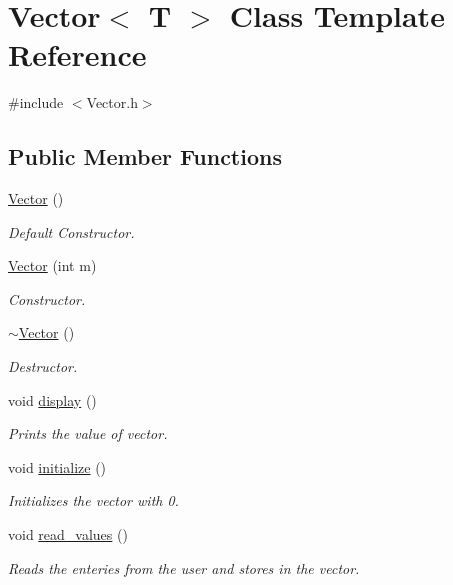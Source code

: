 \hypertarget{class_vector}{}\section{Vector$<$ T $>$ Class Template Reference}
\label{class_vector}


{\ttfamily \#include $<$Vector.\+h$>$}

\subsection*{Public Member Functions}
\begin{DoxyCompactItemize}
\item 
\hyperlink{class_vector_a39d6069675db4ecfc1ab81d440da759a}{Vector} ()
\begin{DoxyCompactList}\small\item\em Default Constructor. \end{DoxyCompactList}\item 
\hyperlink{class_vector_a7233eaf600bca59dbd1a195ccb465cf5}{Vector} (int m)
\begin{DoxyCompactList}\small\item\em Constructor. \end{DoxyCompactList}\item 
\hyperlink{class_vector_aadd88501ee4d48b6da9fa12530373b63}{$\sim$\+Vector} ()
\begin{DoxyCompactList}\small\item\em Destructor. \end{DoxyCompactList}\item 
void \hyperlink{class_vector_af8fbb7be7e884bbd38fd619f791a493b}{display} ()
\begin{DoxyCompactList}\small\item\em Prints the value of vector. \end{DoxyCompactList}\item 
void \hyperlink{class_vector_ac82088c9d33b959876efd77dbc46e2fd}{initialize} ()
\begin{DoxyCompactList}\small\item\em Initializes the vector with 0. \end{DoxyCompactList}\item 
void \hyperlink{class_vector_a0506141fb83169539d9b50c035a4c375}{read\+\_\+values} ()
\begin{DoxyCompactList}\small\item\em Reads the enteries from the user and stores in the vector. \end{DoxyCompactList}\item 

\end{DoxyCompactItemize}
